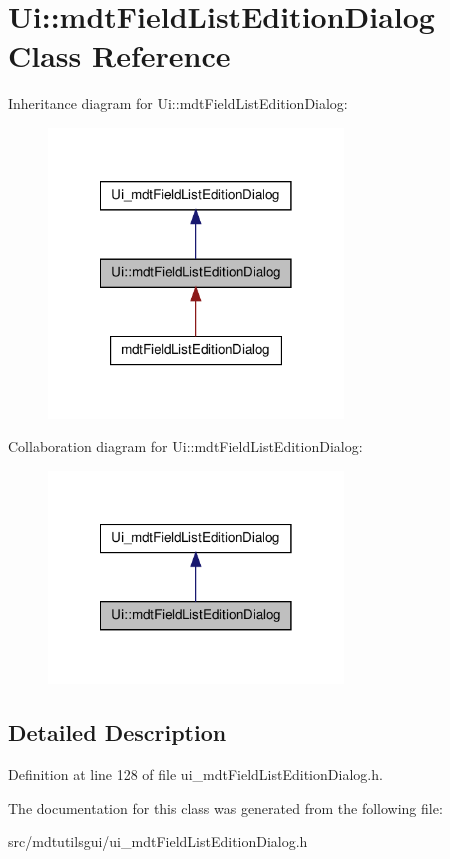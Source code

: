 \hypertarget{class_ui_1_1mdt_field_list_edition_dialog}{
\section{Ui::mdtFieldListEditionDialog Class Reference}
\label{class_ui_1_1mdt_field_list_edition_dialog}
}


Inheritance diagram for Ui::mdtFieldListEditionDialog:\nopagebreak
\begin{figure}[H]
\begin{center}
\leavevmode
\includegraphics[width=222pt]{class_ui_1_1mdt_field_list_edition_dialog__inherit__graph}
\end{center}
\end{figure}


Collaboration diagram for Ui::mdtFieldListEditionDialog:\nopagebreak
\begin{figure}[H]
\begin{center}
\leavevmode
\includegraphics[width=222pt]{class_ui_1_1mdt_field_list_edition_dialog__coll__graph}
\end{center}
\end{figure}


\subsection{Detailed Description}


Definition at line 128 of file ui\_\-mdtFieldListEditionDialog.h.



The documentation for this class was generated from the following file:\begin{DoxyCompactItemize}
\item 
src/mdtutilsgui/ui\_\-mdtFieldListEditionDialog.h\end{DoxyCompactItemize}
